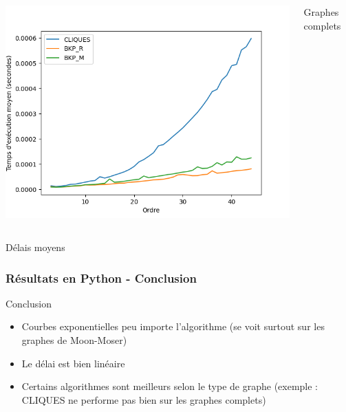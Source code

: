 \documentclass{beamer}
\begin{document}
\begin{frame}
\begin{columns}
    \includegraphics[width=\textwidth]{images/delay_pivot_complete_plot.png}
    \caption{Graphes complets}
  \end{columns}
  \begin{center}
    Délais moyens
  \end{center}
\end{frame}

\begin{frame}
\frametitle{Résultats en Python - Conclusion}
\begin{block}{Conclusion}
\begin{itemize}
  \item Courbes exponentielles peu importe l'algorithme (se voit surtout sur les graphes de Moon-Moser)
  \item Le délai est bien linéaire
  \item Certains algorithmes sont meilleurs selon le type de graphe (exemple : CLIQUES ne performe pas bien sur les graphes complets)
\end{itemize}
\end{block}
\end{frame}
\end{document}
